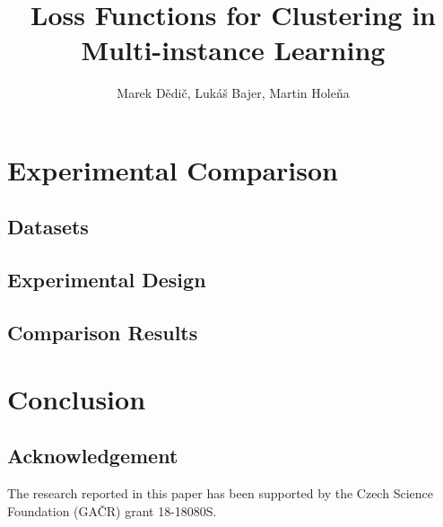 

\title{Loss Functions for Clustering in Multi-instance Learning}
\author{Marek Dědič, Lukáš Bajer, Martin Holeňa}



\twocolumn[\maketitle]






\section{Experimental Comparison}\label{sec:experimental-comparison}

\subsection{Datasets}

\subsection{Experimental Design}

\subsection{Comparison Results}\label{sec:experiment-comparison}

\section{Conclusion}

\subsection*{Acknowledgement}

The research reported in this paper has been supported by the Czech Science Foundation (GAČR) grant 18-18080S.

\printbibliography

